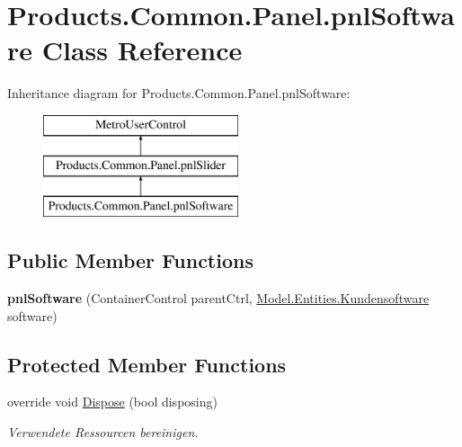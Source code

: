 \hypertarget{class_products_1_1_common_1_1_panel_1_1pnl_software}{}\section{Products.\+Common.\+Panel.\+pnl\+Software Class Reference}
\label{class_products_1_1_common_1_1_panel_1_1pnl_software}
Inheritance diagram for Products.\+Common.\+Panel.\+pnl\+Software\+:\begin{figure}[H]
\begin{center}
\leavevmode
\includegraphics[height=3.000000cm]{class_products_1_1_common_1_1_panel_1_1pnl_software}
\end{center}
\end{figure}
\subsection*{Public Member Functions}
\begin{DoxyCompactItemize}
\item 
{\bfseries pnl\+Software} (Container\+Control parent\+Ctrl, \hyperlink{class_products_1_1_model_1_1_entities_1_1_kundensoftware}{Model.\+Entities.\+Kundensoftware} software)\hypertarget{class_products_1_1_common_1_1_panel_1_1pnl_software_a8fb70b8965971f9c32dc78ad5275b28f}{}\label{class_products_1_1_common_1_1_panel_1_1pnl_software_a8fb70b8965971f9c32dc78ad5275b28f}

\end{DoxyCompactItemize}
\subsection*{Protected Member Functions}
\begin{DoxyCompactItemize}
\item 
override void \hyperlink{class_products_1_1_common_1_1_panel_1_1pnl_software_a42b5ec7706e1357be4cebc463d5bc289}{Dispose} (bool disposing)
\begin{DoxyCompactList}\small\item\em Verwendete Ressourcen bereinigen. \end{DoxyCompactList}\end{DoxyCompactItemize}
